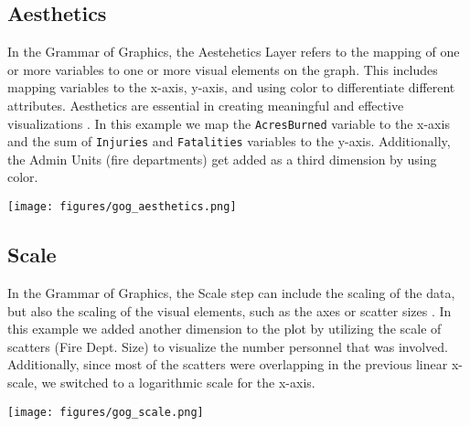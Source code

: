 \vspace{-3mm}

\subsection*{Aesthetics}
\vspace{-2mm}
\begin{minipage}[t]{0.7\textwidth}
    In the Grammar of Graphics, the Aestehetics Layer refers to the mapping of one or more variables to one or more visual elements on the graph. This includes 
    mapping variables to the x-axis, y-axis, and using color to differentiate different attributes. Aesthetics are essential in creating meaningful and 
    effective visualizations \cite{wilkinsonAesthetics2005}.
    In this example we map the \texttt{AcresBurned} variable to the x-axis and the sum of \texttt{Injuries} and \texttt{Fatalities} variables to the y-axis. Additionally,
    the Admin Units (fire departments) get added as a third dimension by using color.
    \hspace{1cm}
\end{minipage}
\begin{minipage}[t]{0.3\textwidth}
    \vspace{-20pt}
    \texttt{[image: figures/gog\_aesthetics.png]}
\end{minipage}

\vspace{-3mm}

\subsection*{Scale}
\vspace{-2mm}
\begin{minipage}[t]{0.7\textwidth}
    In the Grammar of Graphics, the Scale step can include the scaling of the data, but 
    also the scaling of the visual elements, such as the axes or scatter sizes \cite{wilkinsonScales2005}.
    In this example we added another dimension to the plot by utilizing the scale of scatters (Fire Dept. Size) 
    to visualize the number personnel that was involved. Additionally, since most of the scatters were overlapping
    in the previous linear x-scale, we switched to a logarithmic scale for the x-axis.
    \hspace{1cm}
\end{minipage}%
\begin{minipage}[t]{0.3\textwidth}
    \vspace{-20pt}
    \texttt{[image: figures/gog\_scale.png]}
\end{minipage}

